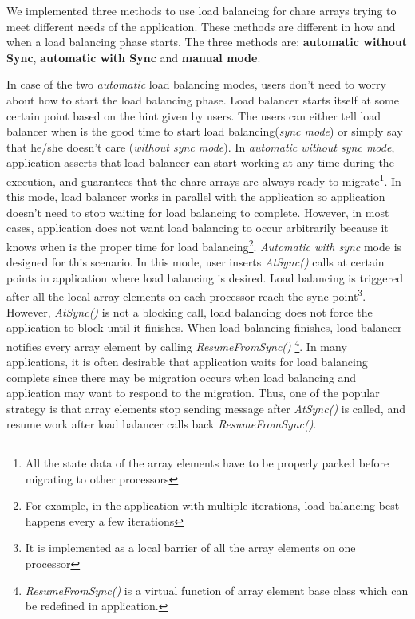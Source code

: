 We implemented three methods to use load balancing for chare arrays
trying to meet different needs of the application. These methods
are different in how and when a load balancing phase starts.
The three methods are: {\bf automatic without Sync}, 
{\bf automatic with Sync} and {\bf manual mode}.

In case of the two {\em automatic} load balancing modes, users don't need 
to worry about how to start the load balancing phase. Load balancer 
starts itself at some certain point based on the hint given by users. 
The users can either tell load balancer when is the good time to start 
load balancing({\em sync mode}) or simply say that he/she doesn't care
({\em without sync mode}). 
In {\em automatic without sync mode}, application asserts
that load balancer can start working at any time during the execution, and
guarantees that the chare arrays are always ready to 
migrate\footnote{All the state data of the array elements have to be 
properly packed before migrating to 
other processors}. In this mode, load balancer works in parallel with 
the application so application doesn't need to stop waiting for load 
balancing to complete. However, in most cases, 
application does not want load balancing to occur arbitrarily because it knows 
when is the proper time for load balancing\footnote{For example, in the 
application with multiple iterations, load balancing best happens 
every a few iterations}. {\em Automatic with sync} mode is designed for this 
scenario. In this mode, user inserts {\em AtSync()} calls at certain points 
in application where load balancing is desired. Load balancing is triggered 
after all the local array elements on each processor reach the sync 
point\footnote{It is implemented as a local barrier of all the array elements
on one processor}. However, {\em AtSync()} is not a blocking call, 
load balancing does not force the application to block until it  
finishes. When load balancing finishes, load balancer notifies every array
element by calling {\em ResumeFromSync()}
\footnote{{\em ResumeFromSync()} is a virtual function of array element
base class which can be redefined in application.}. In many applications,
it is often desirable that application waits for load balancing complete since
there may be migration occurs when load balancing and application may want to
respond to the migration. Thus, one of the popular strategy is that array
elements stop sending message after {\em AtSync()} is called, and resume 
work after load balancer calls back {\em ResumeFromSync()}.

